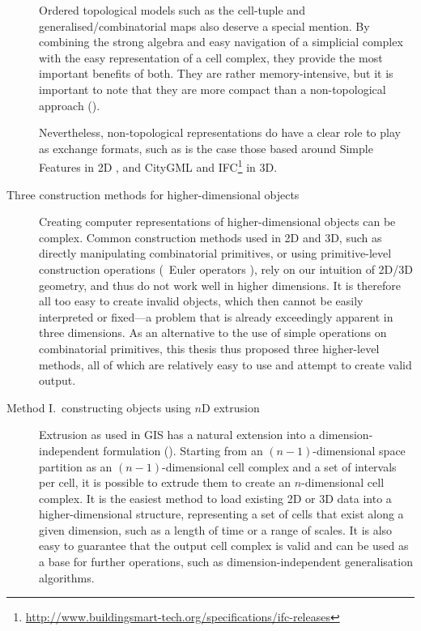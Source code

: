 \begin{description}
Ordered topological models such as the cell-tuple \citep{Brisson93} and generalised/combinatorial maps \citep{Lienhardt94} also deserve a special mention.
By combining the strong algebra and easy navigation of a simplicial complex with the easy representation of a cell complex, they provide the most important benefits of both.
They are rather memory-intensive, but it is important to note that they are more compact than a non-topological approach ().

Nevertheless, non-topological representations do have a clear role to play as exchange formats, such as is the case those based around Simple Features in 2D \citep{SimpleFeatures1}, and CityGML \citep{CityGML2} and IFC\footnote{\url{http://www.buildingsmart-tech.org/specifications/ifc-releases}} in 3D.

\item[Three construction methods for higher-dimensional objects]

Creating computer representations of higher-dimensional objects can be complex.
Common construction methods used in 2D and 3D, such as directly manipulating combinatorial primitives, or using primitive-level construction operations (\eg\ Euler operators \citep{Mantyla88}), rely on our intuition of 2D/3D geometry, and thus do not work well in higher dimensions.
It is therefore all too easy to create invalid objects, which then cannot be easily interpreted or fixed---a problem that is already exceedingly apparent in three dimensions.
As an alternative to the use of simple operations on combinatorial primitives, this thesis thus proposed three higher-level methods, all of which are relatively easy to use and attempt to create valid output.


\item[Method I.\ constructing objects using $n$D extrusion]

Extrusion as used in GIS has a natural extension into a dimension-independent formulation ().
Starting from an $(n-1)$-dimensional space partition as an $(n-1)$-dimensional cell complex and a set of intervals per cell, it is possible to extrude them to create an $n$-dimensional cell complex.
It is the easiest method to load existing 2D or 3D data into a higher-dimensional structure, representing a set of cells that exist along a given dimension, such as a length of time or a range of scales.
It is also easy to guarantee that the output cell complex is valid and can be used as a base for further operations, such as dimension-independent generalisation algorithms.


\end{description}
